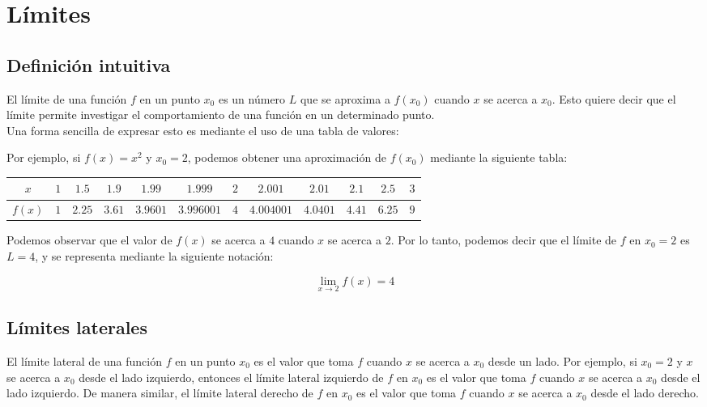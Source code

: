 \chapter{Límites}

\section{Definición intuitiva}

El límite de una función $f$ 
en un punto $x_0$ es un número $L$ que se aproxima a 
$f(x_0)$ cuando $x$ se acerca a $x_0$. Esto quiere decir 
que el límite permite investigar el comportamiento de una 
función en un determinado punto. \\

Una forma sencilla de expresar esto es mediante el uso de una 
tabla de valores:

\ex{} {
    Por ejemplo, si $f(x) = x^2$ y $x_0 = 2$, 
    podemos obtener una aproximación de $f(x_0)$ mediante la 
    siguiente tabla:

    \begin{center}
        \begin{tabular}{c|c|c|c|c|c|c|c|c|c|c|c}
            $x$ & $1$ & $1.5$ & $1.9$ & $1.99$ & $1.999$ & $2$ & $2.001$ & $2.01$ & $2.1$ & $2.5$ & $3$ \\
            \hline
            $f(x)$ & $1$ & $2.25$ & $3.61$ & $3.9601$ & $3.996001$ & $4$ & $4.004001$ & $4.0401$ & $4.41$ & $6.25$ & $9$ \\
        \end{tabular}
    \end{center}


    Podemos observar que el valor de $f(x)$ se acerca a $4$
    cuando $x$ se acerca a $2$. Por lo tanto, podemos decir
    que el límite de $f$ en $x_0 = 2$ es $L = 4$, y se 
    representa mediante la siguiente notación:

    \[
        \lim_{x \to 2} f(x) = 4
    \]
}

\section{Límites laterales}

El límite lateral de una función $f$ en un punto $x_0$ es el 
valor que toma $f$ cuando $x$ se acerca a $x_0$ desde un 
lado. Por ejemplo, si $x_0 = 2$ y $x$ se acerca a $x_0$ desde 
el lado izquierdo, entonces el límite lateral izquierdo de 
$f$ en $x_0$ es el valor que toma $f$ cuando $x$ se acerca a 
$x_0$ desde el lado izquierdo. De manera similar, el límite 
lateral derecho de $f$ en $x_0$ es el valor que toma $f$ 
cuando $x$ se acerca a $x_0$ desde el lado derecho. \\

